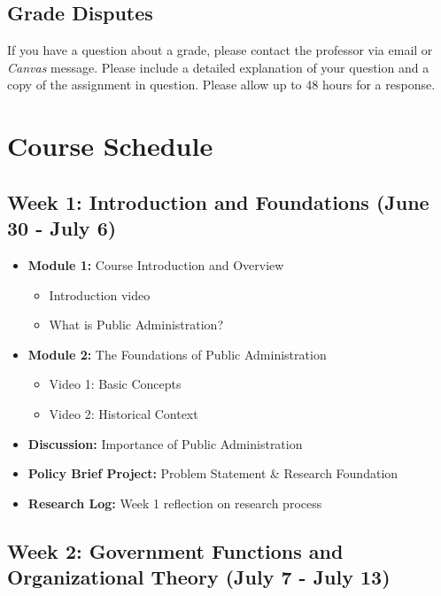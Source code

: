\documentclass[11pt, letterpaper]{article}
\begin{document}
\subsection*{Grade Disputes}

If you have a question about a grade, please contact the professor via email or \emph{Canvas} message. Please include a detailed explanation of your question and a copy of the assignment in question. Please allow up to 48 hours for a response. 

\section{Course Schedule}

\subsection*{Week 1: Introduction and Foundations (June 30 - July 6)}

\begin{itemize}
    \item \textbf{Module 1:} Course Introduction and Overview
        \begin{itemize}
            \item Introduction video
            \item What is Public Administration?
        \end{itemize}
    \item \textbf{Module 2:} The Foundations of Public Administration
        \begin{itemize}
            \item Video 1: Basic Concepts
            \item Video 2: Historical Context
        \end{itemize}
    \item \textbf{Discussion:} Importance of Public Administration
    \item \textbf{Policy Brief Project:} Problem Statement \& Research Foundation
    \item \textbf{Research Log:} Week 1 reflection on research process
\end{itemize}

\subsection*{Week 2: Government Functions and Organizational Theory (July 7 - July 13)}
\end{document}
